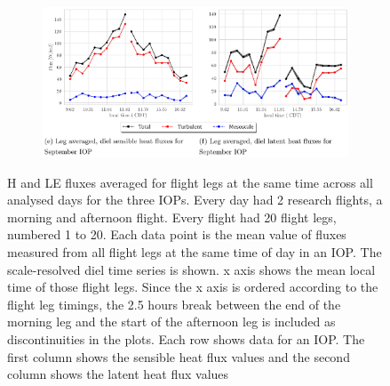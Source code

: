 \documentclass[draft]{agujournal2019}
\begin{document}
\begin{figure}[hbtp]
 \medskip
 \begin{subfigure}{0.98\textwidth}
     \includegraphics[width=\textwidth]{figures_main/IOP03_diel.eps}
     \label{fig:IOP03_diel}
 \end{subfigure}
\caption{H and LE fluxes averaged for flight legs at the same time across all analysed days for the three IOPs. Every day had 2 research flights, a morning and afternoon flight. Every flight had 20 flight legs, numbered 1 to 20. Each data point is the mean value of fluxes measured from all flight legs at the same time of day in an IOP. The scale-resolved diel time series is shown. x axis shows the mean local time of those flight legs. Since the x axis is ordered according to the flight leg timings, the 2.5 hours break between the end of the morning leg and the start of the afternoon leg is included as discontinuities in the plots. Each row shows data for an IOP. The first column shows the sensible heat flux values and the second column shows the latent heat flux values }
\label{fig:IOP_diel}
\end{figure}
\end{document}
